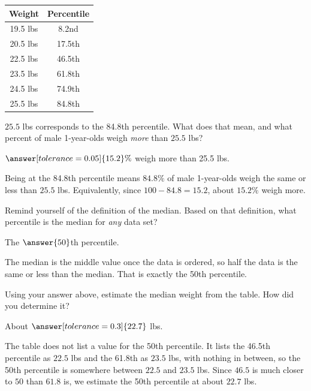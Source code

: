 \documentclass[12pt]{ximera}
\begin{document}
\begin{center}
\begin{tabular}{|c|c|}
\hline
Weight & Percentile \\
\hline
19.5 lbs & 8.2nd \\
\hline
20.5 lbs & 17.5th \\
\hline
22.5 lbs & 46.5th \\
\hline
23.5 lbs & 61.8th \\
\hline
24.5 lbs & 74.9th \\
\hline
25.5 lbs & 84.8th \\
\hline
\end{tabular}
\end{center}

\begin{problem}
$25.5$ lbs corresponds to the 84.8th percentile. What does that mean, and what
percent of male 1-year-olds weigh \emph{more} than $25.5$ lbs?

$\answer[tolerance=0.05]{15.2}\%$ weigh more than 25.5 lbs.

\begin{solution}
Being at the 84.8th percentile means $84.8\%$ of male 1-year-olds weigh the same or
less than $25.5$ lbs. Equivalently, since $100 - 84.8 = 15.2$, about $15.2\%$ weigh
more.
\end{solution}
\end{problem}

\begin{problem}
Remind yourself of the definition of the median. Based on that definition, what
percentile is the median for \emph{any} data set?

The $\answer{50}$th percentile.

\begin{solution}
The median is the middle value once the data is ordered, so half the data is the same
or less than the median. That is exactly the 50th percentile.
\end{solution}
\end{problem}

\begin{problem}
Using your answer above, estimate the median weight from the table. How did you
determine it?

About $\answer[tolerance=0.3]{22.7}$ lbs.

\begin{freeResponse}
\end{freeResponse}

\begin{solution}
The table does not list a value for the 50th percentile. It lists the 46.5th
percentile as $22.5$ lbs and the 61.8th as $23.5$ lbs, with nothing in between, so
the 50th percentile is somewhere between $22.5$ and $23.5$ lbs. Since $46.5$ is much
closer to $50$ than $61.8$ is, we estimate the 50th percentile at about $22.7$ lbs.
\end{solution}
\end{problem}
\end{document}
